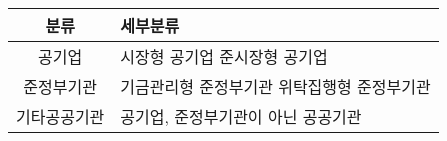 \begin{tabular}{c|p{6cm}}
\toprule
\textbf{분류} & \textbf{세부분류} \\
\midrule
공기업 & 시장형 공기업 \newline 준시장형 공기업 \\
\midrule
준정부기관 & 기금관리형 준정부기관 \newline 위탁집행형 준정부기관 \\
\midrule
기타공공기관 & 공기업, 준정부기관이 아닌 공공기관 \\
\bottomrule
\end{tabular}
